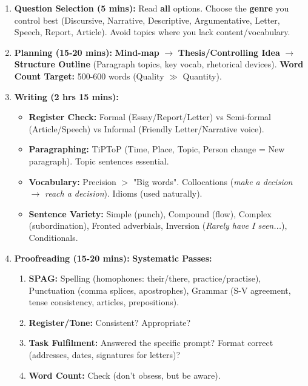 \documentclass[11pt]{article}
\newcommand{\cle}[1]{{\popxbold\color{popdark}#1}}
\begin{document}
\begin{methode}
\begin{enumerate}
    \item \textbf{Question Selection (5 mins):} Read \textbf{all} options. Choose the \textbf{genre} you control best (Discursive, Narrative, Descriptive, Argumentative, Letter, Speech, Report, Article). Avoid topics where you lack content/vocabulary.
    \item \textbf{Planning (15-20 mins):} \textbf{Mind-map} $\rightarrow$ \textbf{Thesis/Controlling Idea} $\rightarrow$ \textbf{Structure Outline} (Paragraph topics, key vocab, rhetorical devices). \textbf{Word Count Target:} 500-600 words (Quality $\gg$ Quantity).
    \item \textbf{Writing (2 hrs 15 mins):}
\begin{itemize}
        \item \textbf{Register Check:} Formal (Essay/Report/Letter) vs Semi-formal (Article/Speech) vs Informal (Friendly Letter/Narrative voice).
        \item \textbf{Paragraphing:} \cle{TiPToP} (Time, Place, Topic, Person change = New paragraph). Topic sentences essential.
        \item \textbf{Vocabulary:} Precision $>$ "Big words". Collocations (\textit{make a decision} $\rightarrow$ \textit{reach a decision}). Idioms (used naturally).
        \item \textbf{Sentence Variety:} Simple (punch), Compound (flow), Complex (subordination), Fronted adverbials, Inversion (\textit{Rarely have I seen...}), Conditionals.
    \end{itemize}
    \item \textbf{Proofreading (15-20 mins):} \textbf{Systematic Passes:}
    \begin{enumerate}
        \item \textbf{SPAG:} Spelling (homophones: their/there, practice/practise), Punctuation (comma splices, apostrophes), Grammar (S-V agreement, tense consistency, articles, prepositions).
        \item \textbf{Register/Tone:} Consistent? Appropriate?
        \item \textbf{Task Fulfilment:} Answered the specific prompt? Format correct (addresses, dates, signatures for letters)?
        \item \textbf{Word Count:} Check (don't obsess, but be aware).
    \end{enumerate}
\end{enumerate}
\end{methode}
\end{document}
